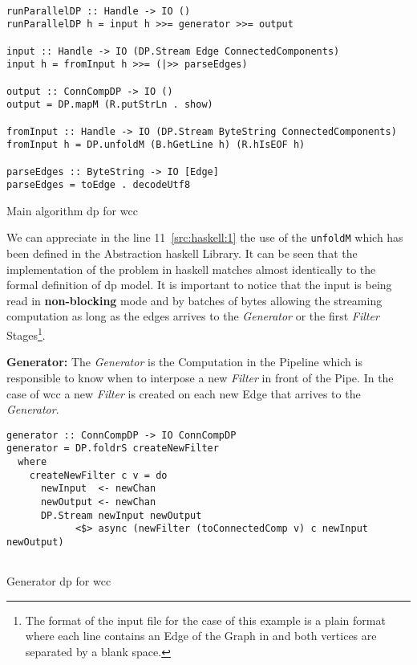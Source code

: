 \documentclass[12pt]{article}
\begin{document}
\begin{listing}[H]
\begin{verbatim}

runParallelDP :: Handle -> IO ()
runParallelDP h = input h >>= generator >>= output

input :: Handle -> IO (DP.Stream Edge ConnectedComponents)
input h = fromInput h >>= (|>> parseEdges)

output :: ConnCompDP -> IO ()
output = DP.mapM (R.putStrLn . show)

fromInput :: Handle -> IO (DP.Stream ByteString ConnectedComponents)
fromInput h = DP.unfoldM (B.hGetLine h) (R.hIsEOF h)

parseEdges :: ByteString -> IO [Edge]
parseEdges = toEdge . decodeUtf8

\end{verbatim}
\caption{Main algorithm \acrshort{dp} for \acrshort{wcc}}
\label{src:haskell:1}
\end{listing}

We can appreciate in the line 11~\ref{src:haskell:1} the use of the \texttt{unfoldM} which has been defined in the Abstraction \acrshort{haskell} Library.
It can be seen that the implementation of the problem in \acrshort{haskell} matches almost identically to the formal definition of \acrshort{dp} model.
It is important to notice that the input is being read in \textbf{non-blocking} mode and by batches of bytes allowing the streaming computation as long as the edges arrives to the 
\textit{Generator} or the first \textit{Filter} Stages\footnote{The format of the input file for the case of this example is a plain format where each line contains an Edge of the Graph in and both vertices are separated by a blank space.}.

\textbf{Generator:}
The \textit{Generator} is the Computation in the Pipeline which is responsible to know when to interpose a new \textit{Filter} in front of the Pipe.
In the case of \acrshort{wcc} a new \textit{Filter} is created on each new Edge that arrives to the \textit{Generator}.

\begin{listing}[H]
\begin{verbatim}
generator :: ConnCompDP -> IO ConnCompDP
generator = DP.foldrS createNewFilter
  where
    createNewFilter c v = do
      newInput  <- newChan
      newOutput <- newChan
      DP.Stream newInput newOutput 
            <$> async (newFilter (toConnectedComp v) c newInput newOutput)
  
  \end{verbatim}
  \caption{Generator \acrshort{dp} for \acrshort{wcc}}
  \label{src:haskell:2}
\end{listing}
\end{document}
